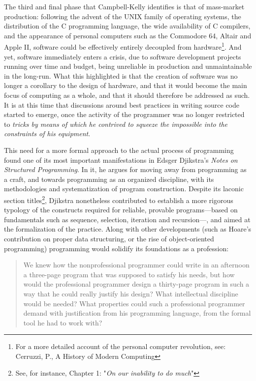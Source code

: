 The third and final phase that Campbell-Kelly identifies is that of mass-market production: following the advent of the UNIX family of operating systems, the distribution of the C programming language, the wide availability of C compilers, and the appearance of personal computers such as the Commodore 64, Altair and Apple II, software could be effectively entirely decoupled from hardware\footnote{For a more detailed account of the personal computer revolution, see: Cerruzzi, P., A History of Modern Computing\cite{ceruzzi_history_2003}}. And yet, software immediately enters a crisis, due to software development projects running over time and budget, being unreliable in production and unmaintainable in the long-run. What this highlighted is that the creation of software was no longer a corollary to the design of hardware, and that it would become the main focus of computing as a whole\cite{ceruzzi_history_2003}, and that it should therefore be addressed as such. It is at this time that discussions around best practices in writing source code started to emerge, once the activity of the programmer was no longer restricted to \emph{tricks by means of which he contrived to squeeze the impossible into the constraints of his equipment}\cite{dijkstra_humble_2007}.

This need for a more formal approach to the actual process of programming found one of its most important manifestations in Edsger Djikstra's \emph{Notes on Structured Programming}\cite{dijkstra_chapter_1972}. In it, he argues for moving away from programming as a craft, and towards programming as an organized discipline, with its methodologies and systematization of program construction. Despite its laconic section titles\footnote{See, for instance, Chapter 1: "\emph{On our inability to do much}"}, Djikstra nonetheless contributed to establish a more rigorous typology of the constructs required for reliable, provable programs—based on fundamentals such as sequence, selection, iteration and recursion—, and aimed at the formalization of the practice. Along with other developments (such as Hoare's contribution on proper data structuring\cite{hoare_chapter_1972}, or the rise of object-oriented programming) programming would solidify its foundations as a profession:

\begin{quote}
    We knew how the nonprofessional programmer could write in an afternoon a three-page program that was supposed to satisfy his needs, but how would the professional programmer design a thirty-page program in such a way that he could really justify his design? What intellectual discipline would be needed? What properties could such a professional programmer demand with justification from his programming language, from the formal tool he had to work with? \cite{dijkstra_ew_programming_1977}
\end{quote}

